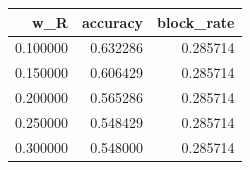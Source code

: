 \begin{tabular}{rrr}
\toprule
w\_R & accuracy & block\_rate \\
\midrule
0.100000 & 0.632286 & 0.285714 \\
0.150000 & 0.606429 & 0.285714 \\
0.200000 & 0.565286 & 0.285714 \\
0.250000 & 0.548429 & 0.285714 \\
0.300000 & 0.548000 & 0.285714 \\
\bottomrule
\end{tabular}
